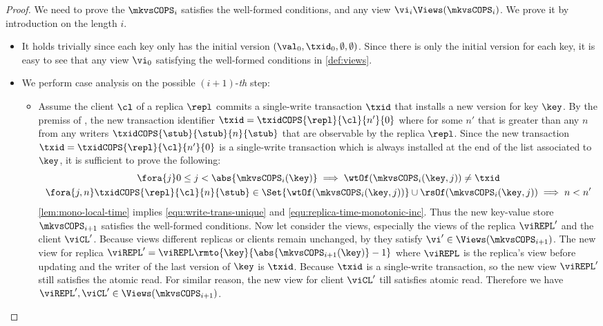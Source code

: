 \begin{proof}
    We need to prove the  \( \mkvsCOPS_i \) satisfies the well-formed conditions,
    and any view \( \vi_i \Views(\mkvsCOPS_i) \).
    We prove it by introduction on the length \( i \).
    \begin{itemize}
    \item {}
        It holds trivially since each key only has the initial version \( (\val_0,\txid_0,\emptyset, \emptyset) \).
        Since there is only the initial version for each key, it is easy to see that any view \( \vi_0 \) satisfying the well-formed conditions in \cref{def:views}.
    \item {}
        We perform case analysis on the possible \((i+1)\)-\emph{th} step:
        \begin{itemize}
            \item {}
                Assume the client \( \cl \) of a replica \( \repl \) commits a single-write transaction \( \txid \) that installs a new version for key \( \key \).
                By the premiss of , the new transaction identifier \( \txid = \txidCOPS{\repl}{\cl}{n'}{0} \) where for some \( n' \) that is greater than any \( n \) from any writers \( \txidCOPS{\stub}{\stub}{n}{\stub} \) that are observable by the replica \( \repl \).
                Since the new transaction \( \txid = \txidCOPS{\repl}{\cl}{n'}{0} \) is a single-write transaction which is always installed at the end of the list associated to \( \key \), it is sufficient to prove the following:
                \begin{gather}
                    \fora{j} 0 \leq j < \abs{ \mkvsCOPS_i(\key) } \implies \wtOf(\mkvsCOPS_{i}(\key, j)) \neq \txid \label{equ:write-trans-unique} \\
                    \fora{j, n} \txidCOPS{\repl}{\cl}{n}{\stub} \in \Set{\wtOf(\mkvsCOPS_{i}(\key,j))} \cup \rsOf(\mkvsCOPS_{i}(\key, j)) \implies n < n' \label{equ:replica-time-monotonic-inc}
                \end{gather}
                \cref{lem:mono-local-time} implies \cref{equ:write-trans-unique} and \cref{equ:replica-time-monotonic-inc}.
                Thus the new key-value store \( \mkvsCOPS_{i+1} \) satisfies the well-formed conditions.
                Now let consider the views, especially the views of the replica \( \viREPL' \) and the client \( \viCL' \).
                Because views different replicas or clients remain unchanged, by \ih they satisfy \( \vi' \in \Views(\mkvsCOPS_{i+1}) \).
                The new view for replica \( \viREPL' = \viREPL\rmto{\key}{\abs{\mkvsCOPS_{i+1}(\key)} - 1} \)
                where \( \viREPL \) is the replica's view before updating and the writer of the last version of \( \key \) is \( \txid \).
                Because \( \txid \) is a single-write transaction, so the new view \( \viREPL' \) still satisfies the atomic read.
                For similar reason, the new view for client \( \viCL' \) till satisfies atomic read.
                Therefore we have \( \viREPL', \viCL' \in \Views(\mkvsCOPS_{i+1}) \).


\end{itemize}
\end{itemize}
\end{proof}
